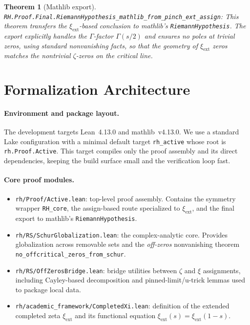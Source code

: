 \documentclass[11pt]{article}
\theoremstyle{plain}
\newtheorem{theorem}{Theorem}[section]
\theoremstyle{definition}
\begin{document}
\begin{theorem}[Mathlib export]
\label{thm:export}
\texttt{RH.Proof.Final.RiemannHypothesis\_mathlib\_from\_pinch\_ext\_assign}: This theorem transfers the \(\xi_{\mathrm{ext}}\)-based conclusion to mathlib's \texttt{RiemannHypothesis}. The export explicitly handles the \(\Gamma\)-factor \(\Gamma(s/2)\) and ensures no poles at trivial zeros, using standard nonvanishing facts, so that the geometry of \(\xi_{\mathrm{ext}}\) zeros matches the nontrivial \(\zeta\)-zeros on the critical line.
\end{theorem}


\section{Formalization Architecture}
\label{sec:formal}

\paragraph{Environment and package layout.}
The development targets Lean~4.13.0 and mathlib~v4.13.0. We use a standard Lake configuration with a minimal default target
\texttt{rh\_active} whose root is \texttt{rh.Proof.Active}. This target compiles only the proof assembly and its direct dependencies, keeping the build surface small and the verification loop fast.

\paragraph{Core proof modules.}
\begin{itemize}
  \item \texttt{rh/Proof/Active.lean}: top-level proof assembly. Contains the symmetry wrapper \texttt{RH\_core}, the assign-based route specialized to \(\xi_{\mathrm{ext}}\), and the final export to mathlib's \texttt{RiemannHypothesis}.
  \item \texttt{rh/RS/SchurGlobalization.lean}: the complex-analytic core. Provides globalization across removable sets and the \emph{off-zeros} non\-vanishing theorem \texttt{no\_offcritical\_zeros\_from\_schur}.
  \item \texttt{rh/RS/OffZerosBridge.lean}: bridge utilities between \(\zeta\) and \(\xi\) assignments, including Cayley-based decomposition and pinned-limit/u-trick lemmas used to package local data.
  \item \texttt{rh/academic\_framework/CompletedXi.lean}: definition of the extended completed zeta \(\xi_{\mathrm{ext}}\) and its functional equation \(\xi_{\mathrm{ext}}(s)=\xi_{\mathrm{ext}}(1-s)\).
\end{itemize}
\end{document}
